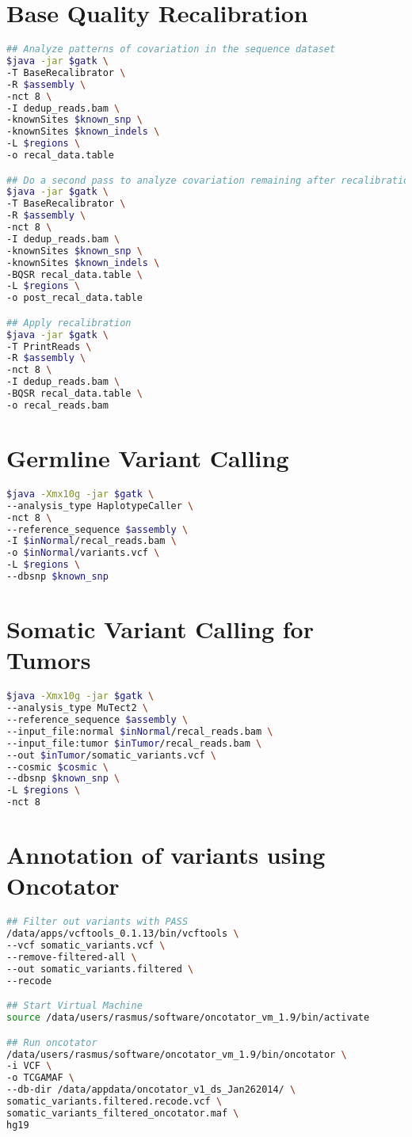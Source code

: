\documentclass[10pt, a4paper]{report}
\begin{document}
\section{Base Quality Recalibration}
\begin{lstlisting}[language=bash]
## Analyze patterns of covariation in the sequence dataset
$java -jar $gatk \
-T BaseRecalibrator \
-R $assembly \
-nct 8 \
-I dedup_reads.bam \
-knownSites $known_snp \
-knownSites $known_indels \
-L $regions \
-o recal_data.table

## Do a second pass to analyze covariation remaining after recalibration
$java -jar $gatk \
-T BaseRecalibrator \
-R $assembly \
-nct 8 \
-I dedup_reads.bam \
-knownSites $known_snp \
-knownSites $known_indels \
-BQSR recal_data.table \
-L $regions \
-o post_recal_data.table

## Apply recalibration
$java -jar $gatk \
-T PrintReads \
-R $assembly \
-nct 8 \
-I dedup_reads.bam \
-BQSR recal_data.table \
-o recal_reads.bam
\end{lstlisting}

\section{Germline Variant Calling}
\begin{lstlisting}[language=bash]
$java -Xmx10g -jar $gatk \
--analysis_type HaplotypeCaller \
-nct 8 \
--reference_sequence $assembly \
-I $inNormal/recal_reads.bam \
-o $inNormal/variants.vcf \
-L $regions \
--dbsnp $known_snp
\end{lstlisting}

\section{Somatic Variant Calling for Tumors}
\begin{lstlisting}[language=bash]
$java -Xmx10g -jar $gatk \
--analysis_type MuTect2 \
--reference_sequence $assembly \
--input_file:normal $inNormal/recal_reads.bam \
--input_file:tumor $inTumor/recal_reads.bam \
--out $inTumor/somatic_variants.vcf \
--cosmic $cosmic \
--dbsnp $known_snp \
-L $regions \
-nct 8
\end{lstlisting}

\section{Annotation of variants using Oncotator}
\begin{lstlisting}[language=bash]
## Filter out variants with PASS
/data/apps/vcftools_0.1.13/bin/vcftools \
--vcf somatic_variants.vcf \
--remove-filtered-all \
--out somatic_variants.filtered \
--recode

## Start Virtual Machine
source /data/users/rasmus/software/oncotator_vm_1.9/bin/activate

## Run oncotator
/data/users/rasmus/software/oncotator_vm_1.9/bin/oncotator \
-i VCF \
-o TCGAMAF \
--db-dir /data/appdata/oncotator_v1_ds_Jan262014/ \
somatic_variants.filtered.recode.vcf \
somatic_variants_filtered_oncotator.maf \
hg19

\end{lstlisting}
\end{document}
